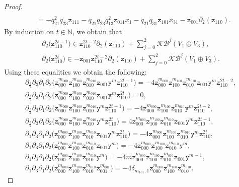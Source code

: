 \documentclass[pdftex]{sigma}
\numberwithin{equation}{section}
\newcommand{\toba}{\mathscr B}
\newcommand{\K}{{\mathcal{K}}}
\newcommand{\N}{{\mathbb N}}
\newcommand{\yt}{\mathtt{y}}
\newcommand{\zt}{\mathtt{z}}
\newcommand{\tresdos}{\frac{3}{2}}
\begin{document}
\begin{proof}
\begin{align*}
\\
& = -q_{21}^2q_{23} \zt_{111}
-q_{21}q_{23}q_{13}^2 \zt_{011}x_1
-q_{21}q_{31} \zt_{101}x_{31}
-\zt_{001}\partial_2(\zt_{110}).
\end{align*}
By induction on $t\in\N$, we obtain that
\begin{gather*}
\partial_2 \big(\zt_{110}^{2t-1}\big) \in \zt_{110}^{2t-2}\partial_2(\zt_{110})+ \sum_{j=0}^2 \K \toba^j(V_1\oplus V_3),
\\[-2mm]
\partial_2 \big(\zt_{110}^{2t}\big) \in -\zt_{001}\zt_{110}^{2t-2}\partial_2(\zt_{110})+ \sum_{j=0}^2 \K \toba^j(V_1\oplus V_3).
\end{gather*}
Using these equalities we obtain the following:
\begin{gather*}
 \partial_{\tresdos}\partial_3\partial_1\partial_2\big(\zt_{000}^{m_{000}} \zt_{100}^{m_{100}} \zt_{010}^{m_{010}} \zt_{001}\yt^m \zt_{110}^{2t-1}\big)=-4 \zt_{000}^{m_{000}} \zt_{100}^{m_{100}} \zt_{010}^{m_{010}}\zt_{001}\yt^m \zt_{110}^{2t-2},
\\
 \partial_{\tresdos}\partial_3\partial_1\partial_2\big(\zt_{000}^{m_{000}} \zt_{100}^{m_{100}} \zt_{010}^{m_{010}} \zt_{001}\yt^m \zt_{110}^{2t}\big)=0,
\\
 \partial_{\tresdos}\partial_3\partial_1\partial_2\big(\zt_{000}^{m_{000}} \zt_{100}^{m_{100}} \zt_{010}^{m_{010}}\yt^m \zt_{110}^{2t-1}\big)=-4 \zt_{000}^{m_{000}} \zt_{100}^{m_{100}} \zt_{010}^{m_{010}}\yt^m \zt_{110}^{2t-2},
\\
 \partial_{\tresdos}\partial_3\partial_1\partial_2\big(\zt_{000}^{m_{000}} \zt_{100}^{m_{100}} \zt_{010}^{m_{010}} \yt^m \zt_{110}^{2t}\big)=4 \zt_{000}^{m_{000}} \zt_{100}^{m_{100}} \zt_{010}^{m_{010}} \zt_{001}\yt^m \zt_{110}^{2t-1},
\\
 \partial_1\partial_3\partial_1\partial_2\big(\zt_{000}^{m_{000}} \zt_{100}^{m_{100}} \zt_{010}^{m_{010}} \zt_{001}\yt^m \zt_{110}^{2t}\big)=-4\zt_{000}^{m_{000}} \zt_{100}^{m_{100}} \zt_{010}^{m_{010}}\yt^m \zt_{110}^{2t},
\\
 \partial_1\partial_3\partial_1\partial_2\big(\zt_{000}^{m_{000}} \zt_{100}^{m_{100}} \zt_{010}^{m_{010}} \zt_{001}\yt^m\big)=-4\zt_{000}^{m_{000}} \zt_{100}^{m_{100}} \zt_{010}^{m_{010}}\yt^m,
\\
 \partial_1\partial_3\partial_1\partial_2\big(\zt_{000}^{m_{000}} \zt_{100}^{m_{100}} \zt_{010}^{m_{010}} \yt^m\big)=-4m\zt_{000}^{m_{000}} \zt_{100}^{m_{100}} \zt_{010}^{m_{010}}\zt_{001}\yt^{m-1},
\\
 \partial_1\partial_3\partial_1\partial_2\big(\zt_{000}^{m_{000}} \zt_{100}^{m_{100}} \zt_{010}^{m_{010}} \zt_{001}^{m_{001}}\big)=-4\delta_{m_{101},1} \zt_{000}^{m_{000}} \zt_{100}^{m_{100}} \zt_{010}^{m_{010}}.

\end{gather*}
\end{proof}
\end{document}
